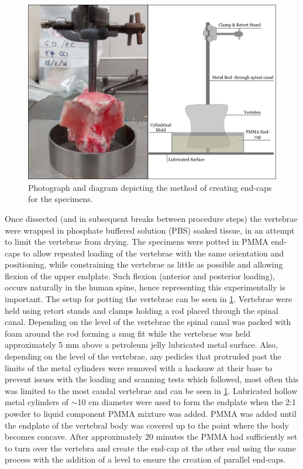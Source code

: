 \begin{figure}[ht!]
\centering
\includegraphics[width=5in]{images/potting_vertebra.png}
\caption{Photograph and diagram depicting the method of creating end-caps for the specimens.}
\label{fig:potting_vertebra}
\end{figure}



Once dissected (and in subsequent breaks between procedure steps) the
vertebrae were wrapped in phosphate buffered solution (PBS) soaked
tissue, in an attempt to limit the vertebrae from drying.
The specimens were potted in PMMA end-caps to allow repeated loading of the vertebrae with
the same orientation and positioning, while constraining the vertebrae
as little as possible and allowing flexion of the upper endplate. 
Such flexion (anterior and posterior loading), occurs naturally in the human spine, hence representing this experimentally is important.
The setup for potting the vertebrae can be seen in \cref{fig:potting_vertebra}.
Vertebrae were held using retort stands and clamps holding a rod placed
through the spinal canal. Depending on the level of the vertebrae the
spinal canal was packed with foam around the rod forming a snug fit
while the vertebrae was held approximately 5 mm above a petroleum jelly
lubricated metal surface. Also, depending on the level of the vertebrae,
any pedicles that protruded past the limits of the metal cylinders were
removed with a hacksaw at their base to prevent issues with the loading
and scanning tests which followed, most often this was limited to the
most caudal vertebrae and can be seen in \cref{fig:potting_vertebra}. Lubricated hollow metal cylinders of \(\sim\)10
cm diameter were used to form the endplate when the 2:1 powder to liquid
component PMMA mixture was added. PMMA was added until the endplate of
the vertebral body was covered up to the point where the body becomes
concave. After approximately 20 minutes the PMMA had sufficiently set to turn over
the vertebra and create the end-cap at the other end using the same
process with the addition of a level to ensure the creation of parallel
end-caps.


